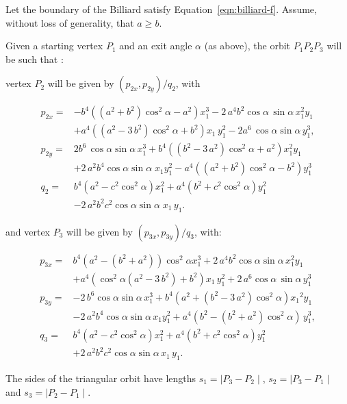 Let the boundary of the Billiard satisfy Equation~\eqref{eqn:billiard-f}. Assume, without loss of generality, that $a{\geq}b$.

Given a starting vertex $P_1$ and an exit angle $\alpha$ (as above), the orbit $P_1P_2P_3$ will be such that \cite{ronaldo19}:

vertex $P_2$ will be given by $(p_{2x},p_{2y})/q_2$, with

\begin{align*}
p_{2x}=&-{b}^{4} \left(  \left(   a^2+{b}^{2}\right)\cos^{2}\alpha   -{a}^{2}  \right) x_1^{3}-2\,{a}^{4}{b}^{2} \cos \alpha  \,\sin  \alpha  \,  x_1^{2}{y_1}\\
&+{a}^{4} \left(  ({a
}^{2}-3\, {b}^{2}) \cos^{2} \alpha  +{b}^{2}
 \right) {x_1}\,y_1^{2}-2{a}^{6} \,\cos  \alpha  \sin   \alpha  \, y_1^{3} ,
\\
p_{2y}=& 2{b}^{6} \,\cos \alpha\sin \alpha\,   x_1^{3}+{b}^{4}\left(  ({b
 }^{2}-3\, {a}^{2}) \cos^{2} \alpha  +{a}^{2}
  \right) x_1^{2}{y_1}\\
&+  2\,{a}^{2} {b}^{4}\cos \alpha \sin
  \alpha \; {x_1} y_1^{2} -{
a}^{4}  \left(  \left(   a^2+{b}^{2}\right)\cos^{2}  \alpha  -{b}^{2}  \right)  y_1^{3}
\\
q_2=&{b}^{4} \left( a^2-c^2\cos^2\alpha   \right)
x_1^{2}+{a}^{4} \left(  {b}^{2}+c^2\cos^2 \alpha  
 \right) y_1^{2}\\
 & - 2\, {a}^{2}{b}^{2}{c^2}\cos \alpha\sin \alpha \; {x_1}\,{
y_1}.
\end{align*}

and vertex $P_3$ will be given by $(p_{3x},p_{3y})/q_3$, with:

\begin{align*}
p_{3x}=& {b}^{4} \left( {a}^{2}- \left( {b}^{2}+{a}^{2} \right) \right)
 \cos^{2}  \alpha   x_1^{3} +2\,{a}^{4}{b}^{2} \cos  \alpha \sin \alpha\,   x_1^{2}{ y_1}\\
 &+{a}^{4} \left( 
  \cos^{2}  \alpha  \left( {a}^{2}-3\,{b}^{2}
 \right) +{b}^{2} \right) { x_1}\, y_1^{2} +2\, {a}^{6} 
 \cos \alpha\,\sin \alpha\, y_1^{3}
\\
p_{3y}=& -2\, {b}^{6} \cos \alpha\sin \alpha\, x_1^{3}+{b}^{4} \left( {a}^{2}+ \left( {b}^{2}-3\,{a}^{2} \right)    \cos^2\alpha \right) {{ x_1}}^{2}{ y_1}
\\
& -2\,{a}^{2}  {b}^{4}\cos
 \alpha  \sin \alpha\,  x_1 y_1^{2}+
 {a}^{4} \left( {b}^{2}- \left( {b}^{2}+{a}^{2} \right)   \cos^{2}  \alpha  \right)\,  y_1^{3},
\\
q_3=& {b}^{4} \left( {a}^{2}-{c^2}\cos^{2}\alpha   \right) x_1^{2}+{a}^{4} \left( {b}^{2}+c^2\cos^{2}\alpha  \right)  y_1^{2}\\
&+2\,{a}^{2}{b}^{
2} c^2 \cos\alpha \sin\alpha\, { x_1}\,{ y_1}.
\end{align*}

The sides of the triangular orbit have lengths 
$s_1=\mid P_3-P_2\mid$, $s_2=\mid P_3-P_1\mid$ and
$s_3=\mid P_2-P_1\mid$.